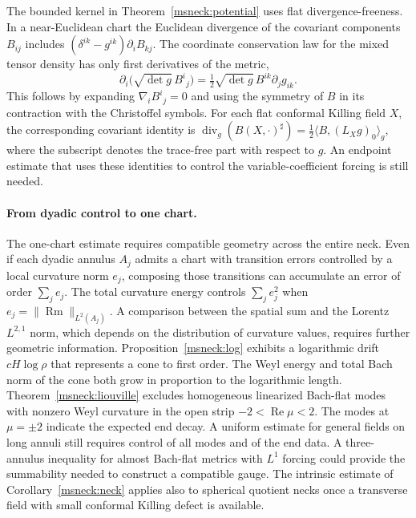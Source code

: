 \documentclass[11pt]{article}
\numberwithin{equation}{section}
\theoremstyle{definition}
\theoremstyle{remark}
\DeclareMathOperator{\Rm}{Rm}
\begin{document}
The bounded kernel in Theorem~\ref{msneck:potential} uses flat
divergence-freeness. In a near-Euclidean chart the Euclidean divergence
of the covariant components \(B_{ij}\) includes
\((\delta^{ik}-g^{ik})\partial_i B_{kj}\). The coordinate conservation
law for the mixed tensor density has only first derivatives of the metric,
\begin{equation}\label{msneck:bach-density}
 \partial_i\bigl(\sqrt{\det g}\,B^i{}_j\bigr)
 =\tfrac12\sqrt{\det g}\,B^{ik}\partial_jg_{ik}.
\end{equation}
This follows by expanding \(\nabla_iB^i{}_j=0\) and using the symmetry of
\(B\) in its contraction with the Christoffel symbols. For each flat
conformal Killing field \(X\), the corresponding covariant identity is
\(\operatorname{div}_g(B(X,\cdot)^\sharp)=\tfrac12\langle B,(L_Xg)_0\rangle_g\),
where the subscript denotes the trace-free part with respect to \(g\).
An endpoint estimate that uses these identities to control the
variable-coefficient forcing is still needed.

\paragraph{From dyadic control to one chart.}
The one-chart estimate requires compatible geometry across the entire
neck. Even if each dyadic annulus \(A_j\) admits a chart with
transition errors controlled by a local curvature norm \(e_j\),
composing those transitions can accumulate an error of order
\(\sum_j e_j\). The total curvature energy controls \(\sum_j e_j^2\)
when \(e_j=\|\Rm\|_{L^2(A_j)}\). A comparison between the spatial
sum and the Lorentz \(L^{2,1}\) norm, which depends on the distribution
of curvature values, requires further geometric information.
Proposition~\ref{msneck:log} exhibits a logarithmic drift \(cH\log\rho\)
that represents a cone to first order. The Weyl energy and total Bach
norm of the cone both grow in proportion to the logarithmic length.
Theorem~\ref{msneck:liouville} excludes homogeneous linearized
Bach-flat modes with nonzero Weyl curvature in the open strip
\(-2<\operatorname{Re}\mu<2\). The modes at \(\mu=\pm2\) indicate
the expected end decay. A uniform estimate for general fields on
long annuli still requires control of all modes and of the end data.
A three-annulus inequality for almost Bach-flat metrics with \(L^1\)
forcing could provide the summability needed to construct a compatible
gauge. The intrinsic estimate of Corollary~\ref{msneck:neck} applies
also to spherical quotient necks once a transverse field with small
conformal Killing defect is available.
\end{document}
